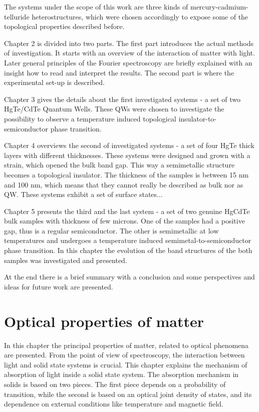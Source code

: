 \documentclass[titlepage,a4paper]{book}
\newcommand{\wciecie}{\quad\phantom{v}}
\begin{document}
The systems under the scope of this work are three kinds of mercury-cadmium-telluride heterostructures, which were chosen accordingly to expose some of the topological properties described before.

Chapter 2 is divided into two parts. The first part introduces the actual methods of investigation. It starts with an overview of the interaction of matter with light. Later general principles of the Fourier spectroscopy are briefly explained with an insight how to read and interpret the results. The second part is where the experimental set-up is described. 

Chapter 3 gives the details about the first investigated systems - a set of two HgTe/CdTe Quantum Wells. These QWs were chosen to investigate the possibility to observe a temperature induced topological insulator-to-semiconductor phase transition.

Chapter 4 overviews the second of investigated systems - a set of four HgTe thick layers with different thicknesses. These systems were designed and grown with a strain, which opened the bulk band gap. This way a semimetallic structure becomes a topological insulator. The thickness of the samples is between 15 nm and 100 nm, which means that they cannot really be described as bulk nor as QW. These systems exhibit a set of surface states... 

Chapter 5 presents the third and the last system - a set of two genuine HgCdTe bulk samples with thickness of few microns. One of the samples had a positive gap, thus is a regular semiconductor. The other is semimetallic at low temperatures and undergoes a temperature induced semimetal-to-semiconductor phase transition. In this chapter the evolution of the band structures of the both samples was investigated and presented.

At the end there is a brief summary with a conclusion and some perspectives and ideas for future work are presented.

\chapter{Optical properties of matter}
\label{chpt:optical}
\wciecie
In this chapter the principal properties of matter, related to optical phenomena are presented. From the point of view of spectroscopy, the interaction between light and solid state systems is crucial. This chapter explains the mechanism of absorption of light inside a solid state system. The absorption mechanism in solids is based on two pieces. The first piece depends on a probability of transition, while the second is based on an optical joint density of states, and its dependence on external conditions like temperature and magnetic field. 
\end{document}
